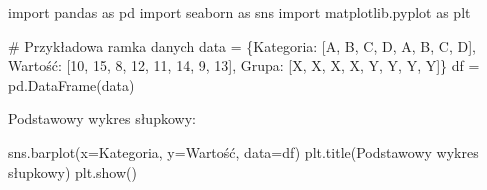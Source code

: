 \documentclass[
  polish,
  letterpaper,
  DIV=11,
  numbers=noendperiod]{scrreprt}
\newenvironment{Shaded}{\begin{snugshade}}{\end{snugshade}}
\newcommand{\CommentTok}[1]{\textcolor[rgb]{0.37,0.37,0.37}{#1}}
\newcommand{\DecValTok}[1]{\textcolor[rgb]{0.68,0.00,0.00}{#1}}
\newcommand{\ImportTok}[1]{\textcolor[rgb]{0.00,0.46,0.62}{#1}}
\newcommand{\NormalTok}[1]{\textcolor[rgb]{0.00,0.23,0.31}{#1}}
\newcommand{\OperatorTok}[1]{\textcolor[rgb]{0.37,0.37,0.37}{#1}}
\newcommand{\StringTok}[1]{\textcolor[rgb]{0.13,0.47,0.30}{#1}}
\begin{document}
\begin{Shaded}
\begin{Highlighting}[]
\ImportTok{import}\NormalTok{ pandas }\ImportTok{as}\NormalTok{ pd}
\ImportTok{import}\NormalTok{ seaborn }\ImportTok{as}\NormalTok{ sns}
\ImportTok{import}\NormalTok{ matplotlib.pyplot }\ImportTok{as}\NormalTok{ plt}

\CommentTok{\# Przykładowa ramka danych}
\NormalTok{data }\OperatorTok{=}\NormalTok{ \{}\StringTok{\textquotesingle{}Kategoria\textquotesingle{}}\NormalTok{: [}\StringTok{\textquotesingle{}A\textquotesingle{}}\NormalTok{, }\StringTok{\textquotesingle{}B\textquotesingle{}}\NormalTok{, }\StringTok{\textquotesingle{}C\textquotesingle{}}\NormalTok{, }\StringTok{\textquotesingle{}D\textquotesingle{}}\NormalTok{, }\StringTok{\textquotesingle{}A\textquotesingle{}}\NormalTok{, }\StringTok{\textquotesingle{}B\textquotesingle{}}\NormalTok{, }\StringTok{\textquotesingle{}C\textquotesingle{}}\NormalTok{, }\StringTok{\textquotesingle{}D\textquotesingle{}}\NormalTok{],}
        \StringTok{\textquotesingle{}Wartość\textquotesingle{}}\NormalTok{: [}\DecValTok{10}\NormalTok{, }\DecValTok{15}\NormalTok{, }\DecValTok{8}\NormalTok{, }\DecValTok{12}\NormalTok{, }\DecValTok{11}\NormalTok{, }\DecValTok{14}\NormalTok{, }\DecValTok{9}\NormalTok{, }\DecValTok{13}\NormalTok{],}
        \StringTok{\textquotesingle{}Grupa\textquotesingle{}}\NormalTok{: [}\StringTok{\textquotesingle{}X\textquotesingle{}}\NormalTok{, }\StringTok{\textquotesingle{}X\textquotesingle{}}\NormalTok{, }\StringTok{\textquotesingle{}X\textquotesingle{}}\NormalTok{, }\StringTok{\textquotesingle{}X\textquotesingle{}}\NormalTok{, }\StringTok{\textquotesingle{}Y\textquotesingle{}}\NormalTok{, }\StringTok{\textquotesingle{}Y\textquotesingle{}}\NormalTok{, }\StringTok{\textquotesingle{}Y\textquotesingle{}}\NormalTok{, }\StringTok{\textquotesingle{}Y\textquotesingle{}}\NormalTok{]\}}
\NormalTok{df }\OperatorTok{=}\NormalTok{ pd.DataFrame(data)}
\end{Highlighting}
\end{Shaded}

Podstawowy wykres słupkowy:

\begin{Shaded}
\begin{Highlighting}[]
\NormalTok{sns.barplot(x}\OperatorTok{=}\StringTok{\textquotesingle{}Kategoria\textquotesingle{}}\NormalTok{, y}\OperatorTok{=}\StringTok{\textquotesingle{}Wartość\textquotesingle{}}\NormalTok{, data}\OperatorTok{=}\NormalTok{df)}
\NormalTok{plt.title(}\StringTok{\textquotesingle{}Podstawowy wykres słupkowy\textquotesingle{}}\NormalTok{)}
\NormalTok{plt.show()}
\end{Highlighting}
\end{Shaded}
\end{document}
